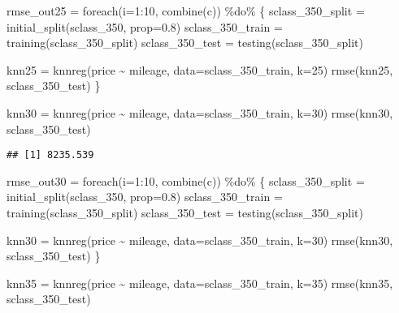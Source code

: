 \documentclass[
]{article}
\newenvironment{Shaded}{\begin{snugshade}}{\end{snugshade}}
\newcommand{\AttributeTok}[1]{\textcolor[rgb]{0.77,0.63,0.00}{#1}}
\newcommand{\DecValTok}[1]{\textcolor[rgb]{0.00,0.00,0.81}{#1}}
\newcommand{\FloatTok}[1]{\textcolor[rgb]{0.00,0.00,0.81}{#1}}
\newcommand{\FunctionTok}[1]{\textcolor[rgb]{0.00,0.00,0.00}{#1}}
\newcommand{\NormalTok}[1]{#1}
\newcommand{\OtherTok}[1]{\textcolor[rgb]{0.56,0.35,0.01}{#1}}
\newcommand{\SpecialCharTok}[1]{\textcolor[rgb]{0.00,0.00,0.00}{#1}}
\newcommand{\StringTok}[1]{\textcolor[rgb]{0.31,0.60,0.02}{#1}}
\begin{document}
\begin{Shaded}
\begin{Highlighting}[]
\NormalTok{rmse\_out25 }\OtherTok{=} \FunctionTok{foreach}\NormalTok{(}\AttributeTok{i=}\DecValTok{1}\SpecialCharTok{:}\DecValTok{10}\NormalTok{, }\FunctionTok{combine}\NormalTok{(}\StringTok{\textquotesingle{}c\textquotesingle{}}\NormalTok{)) }\SpecialCharTok{\%do\%}\NormalTok{ \{}
\NormalTok{  sclass\_350\_split }\OtherTok{=} \FunctionTok{initial\_split}\NormalTok{(sclass\_350, }\AttributeTok{prop=}\FloatTok{0.8}\NormalTok{)}
\NormalTok{  sclass\_350\_train }\OtherTok{=} \FunctionTok{training}\NormalTok{(sclass\_350\_split)}
\NormalTok{  sclass\_350\_test }\OtherTok{=} \FunctionTok{testing}\NormalTok{(sclass\_350\_split)}
  
\NormalTok{  knn25 }\OtherTok{=} \FunctionTok{knnreg}\NormalTok{(price }\SpecialCharTok{\textasciitilde{}}\NormalTok{ mileage, }\AttributeTok{data=}\NormalTok{sclass\_350\_train, }\AttributeTok{k=}\DecValTok{25}\NormalTok{)}
  \FunctionTok{rmse}\NormalTok{(knn25, sclass\_350\_test)}
\NormalTok{\}}

\NormalTok{knn30 }\OtherTok{=} \FunctionTok{knnreg}\NormalTok{(price }\SpecialCharTok{\textasciitilde{}}\NormalTok{ mileage, }\AttributeTok{data=}\NormalTok{sclass\_350\_train, }\AttributeTok{k=}\DecValTok{30}\NormalTok{)}
\FunctionTok{rmse}\NormalTok{(knn30, sclass\_350\_test)}
\end{Highlighting}
\end{Shaded}

\begin{verbatim}
## [1] 8235.539
\end{verbatim}

\begin{Shaded}
\begin{Highlighting}[]
\NormalTok{rmse\_out30 }\OtherTok{=} \FunctionTok{foreach}\NormalTok{(}\AttributeTok{i=}\DecValTok{1}\SpecialCharTok{:}\DecValTok{10}\NormalTok{, }\FunctionTok{combine}\NormalTok{(}\StringTok{\textquotesingle{}c\textquotesingle{}}\NormalTok{)) }\SpecialCharTok{\%do\%}\NormalTok{ \{}
\NormalTok{  sclass\_350\_split }\OtherTok{=} \FunctionTok{initial\_split}\NormalTok{(sclass\_350, }\AttributeTok{prop=}\FloatTok{0.8}\NormalTok{)}
\NormalTok{  sclass\_350\_train }\OtherTok{=} \FunctionTok{training}\NormalTok{(sclass\_350\_split)}
\NormalTok{  sclass\_350\_test }\OtherTok{=} \FunctionTok{testing}\NormalTok{(sclass\_350\_split)}
  
\NormalTok{  knn30 }\OtherTok{=} \FunctionTok{knnreg}\NormalTok{(price }\SpecialCharTok{\textasciitilde{}}\NormalTok{ mileage, }\AttributeTok{data=}\NormalTok{sclass\_350\_train, }\AttributeTok{k=}\DecValTok{30}\NormalTok{)}
  \FunctionTok{rmse}\NormalTok{(knn30, sclass\_350\_test)}
\NormalTok{\}}

\NormalTok{knn35 }\OtherTok{=} \FunctionTok{knnreg}\NormalTok{(price }\SpecialCharTok{\textasciitilde{}}\NormalTok{ mileage, }\AttributeTok{data=}\NormalTok{sclass\_350\_train, }\AttributeTok{k=}\DecValTok{35}\NormalTok{)}
\FunctionTok{rmse}\NormalTok{(knn35, sclass\_350\_test)}
\end{Highlighting}
\end{Shaded}
\end{document}
